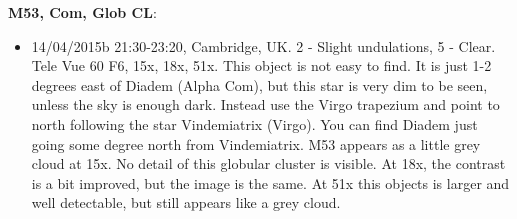 {\bf M53, Com, Glob CL}:
\begin{itemize}
\item 14/04/2015b 21:30-23:20, Cambridge, UK. 2 - Slight undulations, 5 - Clear. Tele Vue 60 F6, 15x, 18x, 51x. This object is not easy to find. It is just 1-2 degrees east of Diadem (Alpha Com), but this star is very dim to be seen, unless the sky is enough dark. Instead use the Virgo trapezium and point to north following the star Vindemiatrix (Virgo). You can find Diadem just going some degree north from Vindemiatrix. M53 appears as a little grey cloud at 15x. No detail of this globular cluster is visible. At 18x, the contrast is a bit improved, but the image is the same. At 51x this objects  is larger and well detectable, but still appears like a grey cloud.
\end{itemize}
